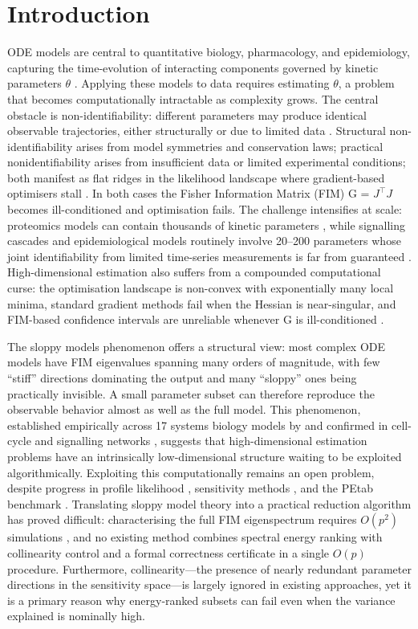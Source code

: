 \documentclass[pdflatex,sn-nature]{sn-jnl}
\begin{document}
\section{Introduction}\label{sec:intro}


ODE models are central to quantitative biology, pharmacology, and epidemiology, capturing the time-evolution of interacting components governed by kinetic parameters $\theta$ \cite{bib16}. Applying these models to data requires estimating $\theta$, a problem that becomes computationally intractable as complexity grows. The central obstacle is non-identifiability: different parameters may produce identical observable trajectories, either structurally or due to limited data \cite{bib4,bib10}. Structural non-identifiability arises from model symmetries and conservation laws; practical nonidentifiability arises from insufficient data or limited experimental conditions; both manifest as flat ridges in the likelihood landscape where gradient-based optimisers stall \cite{bib24,bib25}. In both cases the Fisher Information Matrix (FIM) G = $J^\top J$ becomes ill-conditioned and optimisation fails. The challenge intensifies at scale: proteomics models can contain thousands of kinetic parameters \cite{bib12}, while signalling cascades \cite{bib16} and epidemiological models \cite{bib14} routinely involve 20--200 parameters whose joint identifiability from limited time-series measurements is far from guaranteed \cite{bib24,bib29}. High-dimensional estimation also suffers from a compounded computational curse: the optimisation landscape is non-convex with exponentially many local minima, standard gradient methods fail when the Hessian is near-singular, and FIM-based confidence intervals are unreliable whenever G is ill-conditioned \cite{bib17}.


The sloppy models phenomenon \cite{bib15} offers a structural view: most complex ODE models have FIM eigenvalues spanning many orders of magnitude, with few ``stiff'' directions dominating the output and many ``sloppy'' ones being practically invisible. A small parameter subset can therefore reproduce the observable behavior almost as well as the full model. This phenomenon, established empirically across 17 systems biology models by \cite{bib15} and confirmed in cell-cycle and signalling networks \cite{bib18,bib6}, suggests that high-dimensional estimation problems have an intrinsically low-dimensional structure waiting to be exploited algorithmically. Exploiting this computationally remains an open problem, despite progress in profile likelihood \cite{bib24,bib25}, sensitivity methods \cite{bib26,bib23}, and the PEtab benchmark \cite{bib27}. Translating sloppy model theory into a practical reduction algorithm has proved difficult: characterising the full FIM eigenspectrum requires $O(p^2)$ simulations \cite{bib15}, and no existing method combines spectral energy ranking with collinearity control and a formal correctness certificate in a single $O(p)$ procedure. Furthermore, collinearity---the presence of nearly redundant parameter directions in the sensitivity space---is largely ignored in existing approaches, yet it is a primary reason why energy-ranked subsets can fail even when the variance explained is nominally high.
\end{document}
